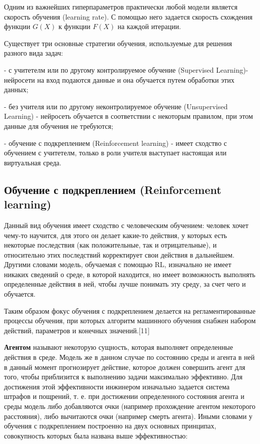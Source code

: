 \documentclass[bachelor, och, coursework]{shiza}
\begin{document}
Одним из важнейших гиперпараметров практически любой модели является скорость обучения (learning rate). С помощью него задается скорость схождения функции
$G(X)$ к функции $F(X)$ на каждой итерации.

Существует три основные стратегии обучения, используемые для решения разного вида задач:

- с учитетелм или по другому контролируемое обучение (Supervised Learning)- нейросети на вход подаются данные и она обучается путем обработки этих данных;

- без учителя или по другому неконтролируемое обучение (Unsupervised Learning) - нейросеть обучается в соответствии с некоторым правилом, при этом данные для обучения не требуются;

- обучение с подкреплением (Reinforcement learning) - имеет сходство с обучением с учитетелм, только в роли учителя выступает настоящая или виртуальная среда.

\subsection{Обучение с подкреплением (Reinforcement learning)}

Данный вид обучения имеет сходство с человеческим обучением: человек хочет чему-то научится, для этого он делает какие-то действия, у которых есть некоторые
последствия (как положительные, так и отрицательные), и относительно этих последствий корректирует свои действия в дальнейшем. Другими словами модель, обучаемая
с помощью RL, изначально не имеет никаких сведений о среде, в которой находится, но имеет возможность выполнять определенные действия в ней, чтобы лучше
понимать эту среду, за счет чего и обучается.

Таким образом фокус обучения с подкреплением делается на регламентированные процессы обучения, при которых алгоритм машинного обучения снабжен набором действий, параметров и конечных значений.[11]

\textbf{Агентом} называют некоторую сущность, которая выполняет определенные действия в среде. Модель же в данном случае по состоянию среды и агента в ней
в данный момент прогнозирует действие, которое должен совершить агент для того, чтобы приблизится к выполнению задачи максимально эффективно. Для достижения
этой эффективности инжинером изначально задается система штрафов и пощрений, т. е. при достижении определенного состояния агента и среды модель либо добавляются очки
(например прохождение агентом некоторого расстояния), либо вычитаются очки (например смерть агента). Иными словами у обучения с подкреплением построенно на двух
основных принципах, совокупность которых была названа выше эффективностью:
\end{document}
